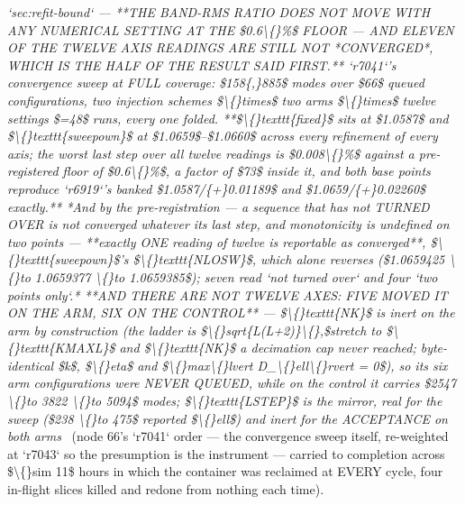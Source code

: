 \begin{description}
\textit{`sec:refit-bound` --- **THE BAND-RMS RATIO DOES NOT MOVE WITH ANY NUMERICAL SETTING AT THE \$0.6\textbackslash\{\}\%\$ FLOOR --- AND ELEVEN OF THE TWELVE AXIS READINGS ARE STILL NOT *CONVERGED*, WHICH IS THE HALF OF THE RESULT SAID FIRST.** `r7041`'s convergence sweep at FULL coverage: \$158\{,\}885\$ modes over \$66\$ queued configurations, two injection schemes \$\textbackslash\{\}times\$ two arms \$\textbackslash\{\}times\$ twelve settings \$=48\$ runs, every one folded. **\$\textbackslash\{\}texttt\{fixed\}\$ sits at \$1.0587\$ and \$\textbackslash\{\}texttt\{sweepown\}\$ at \$1.0659\$--\$1.0660\$ across every refinement of every axis; the worst last step over all twelve readings is \$0.008\textbackslash\{\}\%\$ against a pre-registered floor of \$0.6\textbackslash\{\}\%\$, a factor of \$73\$ inside it, and both base points reproduce `r6919`'s banked \$1.0587/\{+\}0.01189\$ and \$1.0659/\{+\}0.02260\$ exactly.**  *And by the pre-registration --- a sequence that has not TURNED OVER is not converged whatever its last step, and monotonicity is undefined on two points --- **exactly ONE reading of twelve is reportable as converged**, \$\textbackslash\{\}texttt\{sweepown\}\$'s \$\textbackslash\{\}texttt\{NLOSW\}\$, which alone reverses (\$1.0659425 \textbackslash\{\}to 1.0659377 \textbackslash\{\}to 1.0659385\$); seven read `not turned over` and four `two points only`.*  **AND THERE ARE NOT TWELVE AXES: FIVE MOVED IT ON THE ARM, SIX ON THE CONTROL** --- \$\textbackslash\{\}texttt\{NK\}\$ is inert on the arm by construction (the ladder is \$\textbackslash\{\}sqrt\{L(L+2)\}\textbackslash\{\},\$stretch to \$\textbackslash\{\}texttt\{KMAXL\}\$ and \$\textbackslash\{\}texttt\{NK\}\$ a decimation cap never reached; byte-identical \$k\$, \$\textbackslash\{\}eta\$ and \$\textbackslash\{\}max\textbackslash\{\}lvert D\_\textbackslash\{\}ell\textbackslash\{\}rvert = 0\$), so its six arm configurations were NEVER QUEUED, while on the control it carries \$2547 \textbackslash\{\}to 3822 \textbackslash\{\}to 5094\$ modes; \$\textbackslash\{\}texttt\{LSTEP\}\$ is the mirror, real for the sweep (\$238 \textbackslash\{\}to 475\$ reported \$\textbackslash\{\}ell\$) and inert for the ACCEPTANCE on both arms} \ (node 66's `r7041` order --- the convergence sweep itself, re-weighted at `r7043` so the presumption is the instrument --- carried to completion across \$\textbackslash\{\}sim 11\$ hours in which the container was reclaimed at EVERY cycle, four in-flight slices killed and redone from nothing each time). 

\end{description}
